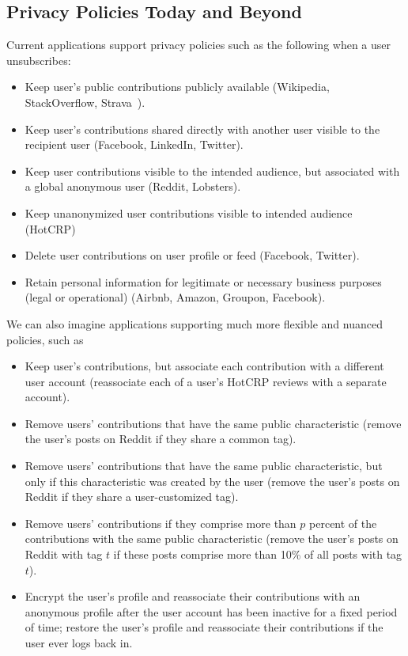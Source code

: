 \subsection{Privacy Policies Today and Beyond}

Current applications support privacy policies such as the following when a user unsubscribes:
\begin{itemize}
    \item Keep user's public contributions publicly available (\eg Wikipedia, StackOverflow,
        Strava~\cite{strava:privacy}).
    \item Keep user's contributions shared directly with another user visible to the recipient user (\eg Facebook,
        LinkedIn, Twitter).
    \item Keep user contributions visible to the intended audience, but associated with a global
        anonymous user (\eg Reddit, Lobsters).
    \item Keep unanonymized user contributions visible to intended audience (\eg HotCRP)
    \item Delete user contributions on user profile or feed (\eg Facebook, Twitter).
    \item Retain personal information for legitimate or necessary business purposes (legal or
        operational) (\eg Airbnb, Amazon, Groupon, Facebook).
\end{itemize}

We can also imagine applications supporting much more flexible and nuanced policies, such as
\begin{itemize}
    \item Keep user's contributions, but associate each contribution with a different user account
        (\eg reassociate each of a user's HotCRP reviews with a separate account).
    \item Remove users' contributions that have the same public characteristic (\eg remove the user's
       posts on Reddit if they share a common tag).
    \item Remove users' contributions that have the same public characteristic, but only if this
        characteristic was created by the user (\eg remove the user's posts on Reddit if they share
        a user-customized tag).  
    \item Remove users' contributions if they comprise more than $p$
            percent of the contributions with the same public characteristic (\eg remove the user's
            posts on Reddit with tag $t$ if these posts comprise more than 10\% of all posts with
            tag $t$).
    \item Encrypt the user's profile and reassociate their contributions with an anonymous
        profile after the user account has been inactive for a fixed period of time;
        restore the user's profile and reassociate their contributions if the user ever logs back in.
\end{itemize}

